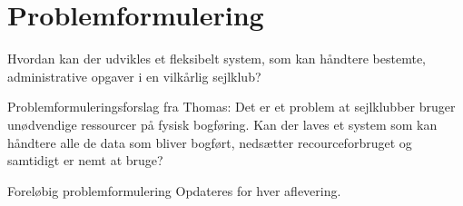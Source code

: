 \chapter{Problemformulering}\label{chap:problemformulering}

Hvordan kan der udvikles et fleksibelt system, som kan håndtere bestemte, administrative opgaver i en vilkårlig sejlklub?

Problemformuleringsforslag fra Thomas:
Det er et problem at sejlklubber bruger unødvendige ressourcer på fysisk bogføring. Kan der laves et system som kan håndtere alle de data som bliver bogført, nedsætter recourceforbruget og samtidigt er nemt at bruge? 


\begin{anfxnote}{Foreløbig problemformulering}
  Opdateres for hver aflevering.
\end{anfxnote}
